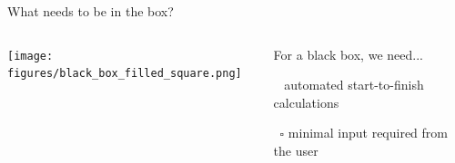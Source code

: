 \documentclass[xcolor=table,aspectratio=169]{beamer}
\numberwithin{equation}{section}
\begin{document}
\begin{frame}{What needs to be in the box?}

   \begin{columns}
      \begin{column}{0.5\textwidth}
         \texttt{[image: figures/black\_box\_filled\_square.png]}
      \end{column}
      \begin{column}{0.5\textwidth}
         For a black box, we need...

         \vspace{1ex}
         \
         \only<1>{$\square$}%
         \only<2->{%
            \rlap{$\square$}{\raisebox{2pt}{\large\hspace{1pt}\ding{51}}}%
            \hspace{-2.5pt}}
         automated start-to-finish calculations

         \vspace{1ex}
         \ $\square$ minimal input required from the user
      \end{column}
   \end{columns}
\end{frame}
% 
\end{document}
